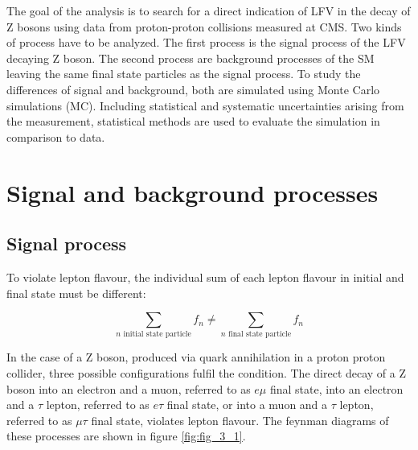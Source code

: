 The goal of the analysis is to search for a direct indication of \gls{LFV} in the decay of Z bosons using data from proton-proton collisions measured at \gls{CMS}. Two kinds of process have to be analyzed. The first process is the signal process of the \gls{LFV} decaying Z boson. The second process are background processes of the \gls{SM} leaving the same final state particles as the signal process. To study the differences of signal and background, both are simulated using Monte Carlo simulations (\gls{MC}). Including statistical and systematic uncertainties arising from the measurement, statistical methods are used to evaluate the simulation in comparison to data. 


\section{Signal and background processes}

\subsection{Signal process}
\label{sec:section_3_1_1}

To violate lepton flavour, the individual sum of each lepton flavour in initial and final state must be different: 

\begin{equation}
	\label{eq:eq_3_1}
	\sum_{n \text{ initial state particle}} f_{n} \neq  \sum_{n \text{ final state particle}} f_{n}
\end{equation}

In the case of a Z boson, produced via quark annihilation in a proton proton collider, three possible configurations fulfil the condition. The direct decay of a Z boson into an electron and a muon, referred to as $e\mu$ final state, into an electron and a $\tau$ lepton, referred to as $e\tau$ final state, or into a muon and a $\tau$ lepton, referred to as $\mu\tau$ final state, violates lepton flavour. The feynman diagrams of these processes are shown in figure \ref{fig:fig_3_1}. \\

